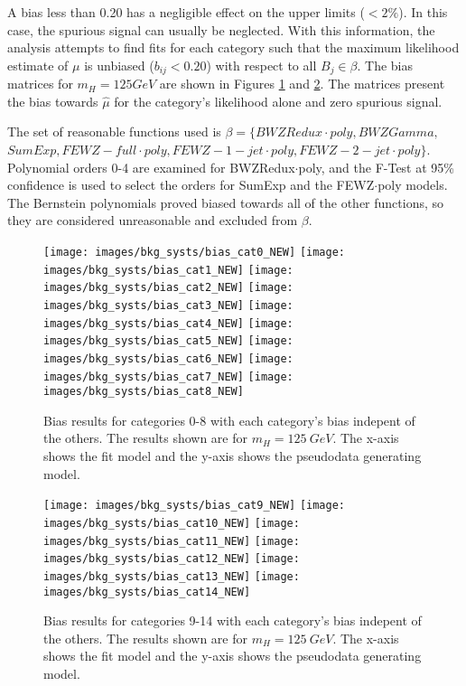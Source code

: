 A bias less than 0.20 has a negligible effect on the upper limits ($<2\%$). In this case, the spurious signal can usually be neglected. With this information, the analysis attempts to find fits for each category such that the maximum likelihood estimate of $\mu$ is unbiased ($b_{ij} < 0.20$) with respect to all $B_j \in \beta$. The bias matrices for $m_H=125 GeV$ are shown in Figures \ref{fig:bias_1} and \ref{fig:bias_2}. The matrices present the bias towards $\hat{\mu}$ for the category's likelihood alone and zero spurious signal. 

The set of reasonable functions used is $\beta = \{BWZRedux\cdot poly, BWZGamma,$ 
$SumExp, FEWZ-full\cdot poly, FEWZ-1-jet\cdot poly, FEWZ-2-jet\cdot poly\}$. Polynomial orders 0-4 are examined for BWZRedux$\cdot$poly, and the F-Test at 95\% confidence is used to select the orders for SumExp and the FEWZ$\cdot$poly models. The Bernstein polynomials proved biased towards all of the other functions, so they are considered unreasonable and excluded from $\beta$. 
\begin{figure}[h!]
    \centering
    \texttt{[image: images/bkg\_systs/bias\_cat0\_NEW]}
    \texttt{[image: images/bkg\_systs/bias\_cat1\_NEW]}
    \texttt{[image: images/bkg\_systs/bias\_cat2\_NEW]} 
    \texttt{[image: images/bkg\_systs/bias\_cat3\_NEW]}
    \texttt{[image: images/bkg\_systs/bias\_cat4\_NEW]}
    \texttt{[image: images/bkg\_systs/bias\_cat5\_NEW]}
    \texttt{[image: images/bkg\_systs/bias\_cat6\_NEW]}
    \texttt{[image: images/bkg\_systs/bias\_cat7\_NEW]}
    \texttt{[image: images/bkg\_systs/bias\_cat8\_NEW]}
    \caption[Background bias results for the categories 0 to 8.]
        {Bias results for categories 0-8 with each category's bias indepent of the others.
        The results shown are for $m_H=125\ GeV$.
        The x-axis shows the fit model and the y-axis shows the pseudodata generating model.}
    \label{fig:bias_1}
\end{figure}

\begin{figure}[h!]
    \centering
    \texttt{[image: images/bkg\_systs/bias\_cat9\_NEW]}
    \texttt{[image: images/bkg\_systs/bias\_cat10\_NEW]}
    \texttt{[image: images/bkg\_systs/bias\_cat11\_NEW]}
    \texttt{[image: images/bkg\_systs/bias\_cat12\_NEW]}
    \texttt{[image: images/bkg\_systs/bias\_cat13\_NEW]}
    \texttt{[image: images/bkg\_systs/bias\_cat14\_NEW]}
    \caption[Background bias results for the categories 9 to 14.]
        {Bias results for categories 9-14 with each category's bias indepent of the others.
        The results shown are for $m_H=125\ GeV$.
        The x-axis shows the fit model and the y-axis shows the pseudodata generating model.}
    \label{fig:bias_2}
\end{figure}

